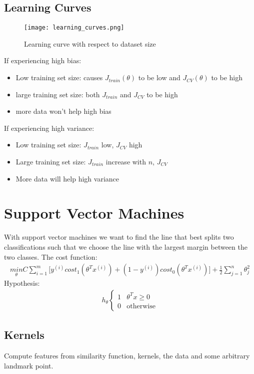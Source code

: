 \documentclass[12pt]{article}
\begin{document}
\subsection{Learning Curves}
\begin{figure}
\centering
\texttt{[image: learning\_curves.png]}
\caption{Learning curve with respect to dataset size}
\label{fig:learningcurves}
\end{figure}
If experiencing high bias:
\begin{itemize}
	\item Low training set size: causes $J_{train}(\theta)$ to be low and $J_{CV}(\theta)$ to be high
	\item large training set size: both $J_{train}$ and $J_{CV}$ to be high
	\item more data won't help high bias
\end{itemize}
If experiencing high variance:
\begin{itemize}
	\item Low training set size: $J_{train}$ low, $J_{CV}$ high
	\item Large training set size: $J_{train}$ increase with $n$, $J_{CV}$
	\item More data will help high variance
\end{itemize}

\section{Support Vector Machines}
With support vector machines we want to find the line that best splits two classifications such that we choose the line with the largest margin between the two classes. 
The cost function:
\begin{align*}
\underset{\theta}{min}C\sum_{i=1}^{m}\bigg[y^{(i)}cost_1(\theta^Tx^{(i)})+(1-y^{(i)})cost_0(\theta^Tx^{(i)})\bigg] + \frac{1}{2}\sum_{j=1}^{n}\theta_j^2
\end{align*}
Hypothesis:
\begin{align*}
	h_\theta \begin{cases}
		1 & \theta^Tx\ge 0 \\
		0 & \text{otherwise}
	\end{cases}
\end{align*}

\subsection{Kernels}
Compute features from similarity function, kernels, the data and some arbitrary landmark point. \\
\end{document}
